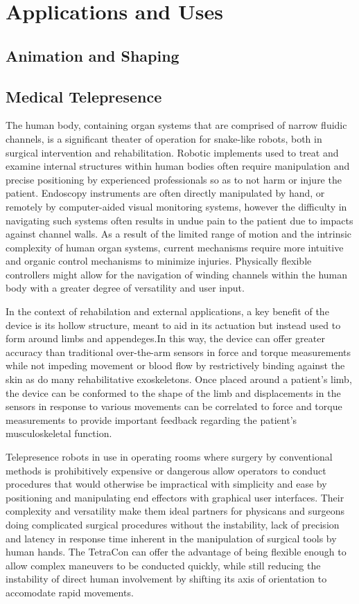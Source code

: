 \documentclass[11pt]{article}
\begin{document}
\section{Applications and Uses}
\subsection{Animation and Shaping}
\subsection{Medical Telepresence}

The human body, containing organ systems that are comprised of narrow fluidic channels, is a significant theater of operation for snake-like robots, both in surgical intervention and rehabilitation. Robotic implements used to treat and examine internal structures within human bodies often require manipulation and precise positioning by experienced professionals so as to not harm or injure the patient. Endoscopy instruments are often directly manipulated by hand, or remotely by computer-aided visual monitoring systems, however the difficulty in navigating such systems often results in undue pain to the patient due to impacts against channel walls. As a result of the limited range of motion and the intrinsic complexity of human organ systems, current mechanisms require more intuitive and organic control mechanisms to minimize injuries. Physically flexible controllers might allow for the navigation of winding channels within the human body with a greater degree of versatility and user input.

 In the context of rehabilation and external applications, a key benefit of the device is its hollow structure, meant to aid in its actuation but instead used to form around limbs and appendeges.In this way, the device can offer greater accuracy than traditional over-the-arm sensors in force and torque measurements while not impeding movement or blood flow by restrictively binding against the skin as do many rehabilitative exoskeletons. Once placed around a patient's limb, the device can be conformed to the shape of the limb and displacements in the sensors in response to various movements can be correlated to force and torque measurements to provide important feedback regarding the patient's musculoskeletal function.

 Telepresence robots in use in operating rooms where surgery by conventional methods is prohibitively expensive or dangerous allow operators to conduct procedures that would otherwise be impractical with simplicity and ease by positioning and manipulating end effectors with graphical user interfaces. Their complexity and versatility make them ideal partners for physicans and surgeons doing complicated surgical procedures without the instability, lack of precision and latency in response time inherent in the manipulation of surgical tools by human hands. The TetraCon can offer the advantage of being flexible enough to allow complex maneuvers to be conducted quickly, while still reducing the instability of direct human involvement by shifting its axis of orientation to accomodate rapid movements.
\end{document}
